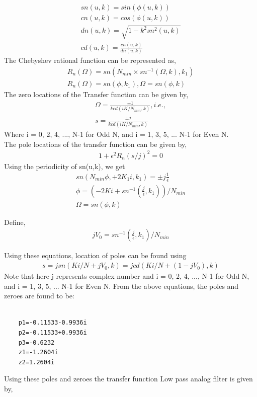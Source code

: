 \documentclass[12pt]{article}
\begin{document}
\begin{gather*}
	sn(u,k) = sin(\phi(u,k))\\
	cn(u,k) = cos(\phi(u,k))\\
	dn(u,k) = \sqrt{1-k^2sn^2(u,k)}\\
	cd(u,k) = \frac{cn(u,k)}{dn(u,k)}
\end{gather*}
The Chebyshev rational function can be represented as,
\begin{gather*}
	R_n(\Omega) = sn(N_{min}\times sn^{-1}(\Omega,k),k_1)\\
	R_n(\Omega) = sn(\phi,k_1), \Omega = sn(\phi,k)
\end{gather*}
The zero locations of the Transfer function can be given by,
\begin{gather*}
	\Omega = \frac{\pm1}{k cd(iK/N_{min},k)}, i.e.,\\
	s = \frac{\pm j}{k cd(iK/N_{min},k)}
\end{gather*}
Where i = 0, 2, 4, ..., N-1 for Odd N, and i = 1, 3, 5, ... N-1 for Even N.\\
The pole locations of the transfer function can be given by,
\begin{gather*}
	 1 + \epsilon^2R_n(s/j)^2 = 0
\end{gather*}
Using the periodicity of sn(u,k), we get
\begin{gather*}
	sn(N_{min}\phi, + 2K_1i,k_1) = \pm j\frac{1}{\epsilon}\\
	\phi = (-2Ki + sn^{-1}(\frac{j}{\epsilon},k_1))/N_{min}\\
	\Omega = sn(\phi,k)
\end{gather*}

\noindent Define, 
\begin{gather*}
	jV_0 = sn^{-1}(\frac{j}{\epsilon},k_1)/N_{min}
\end{gather*}

Using these equations, location of poles can be found using
\begin{gather*}
s = j sn(Ki/N + jV_0,k) = jcd(Ki/N + (1-jV_0),k)
\end{gather*}
Note that here j represents complex number and i = 0, 2, 4, ..., N-1 for Odd N, and i = 1, 3, 5, ... N-1 for Even N.
From the above equations, the poles and zeroes are found to be:
\begin{verbatim}
	
	p1=-0.11533-0.9936i
	p2=-0.11533+0.9936i
	p3=-0.6232
	z1=-1.2604i
	z2=1.2604i 
\end{verbatim}
Using these poles and zeroes the transfer function Low pass analog filter is given by,
\end{document}
